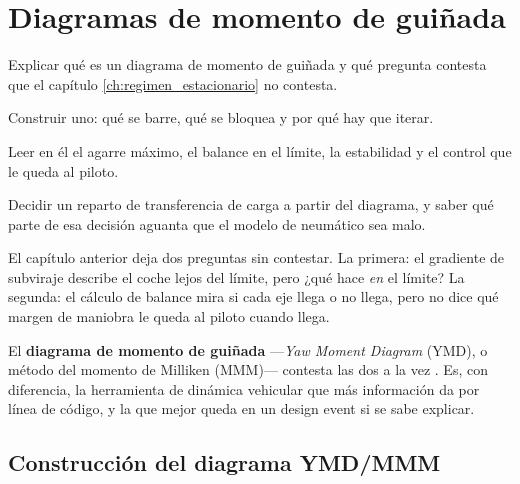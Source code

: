 \chapter{Diagramas de momento de guiñada}
\label{ch:diagramas_ymd}

\begin{objetivos}
  \item Explicar qué es un diagrama de momento de guiñada y qué pregunta
        contesta que el capítulo \ref{ch:regimen_estacionario} no contesta.
  \item Construir uno: qué se barre, qué se bloquea y por qué hay que iterar.
  \item Leer en él el agarre máximo, el balance en el límite, la estabilidad y
        el control que le queda al piloto.
  \item Decidir un reparto de transferencia de carga a partir del diagrama, y
        saber qué parte de esa decisión aguanta que el modelo de neumático sea
        malo.
\end{objetivos}


El capítulo anterior deja dos preguntas sin contestar. La primera: el gradiente
de subviraje describe el coche lejos del límite, pero ¿qué hace \emph{en} el
límite? La segunda: el cálculo de balance mira si cada eje llega o no llega,
pero no dice qué margen de maniobra le queda al piloto cuando llega.

El \textbf{diagrama de momento de guiñada} ---\emph{Yaw Moment Diagram} (YMD),
o método del momento de Milliken (MMM)--- contesta las dos a la vez
\cite{milliken_rcvd_1995}. Es, con diferencia, la herramienta de dinámica
vehicular que más información da por línea de código, y la que mejor queda en
un design event si se sabe explicar.

\section{Construcción del diagrama YMD/MMM}
\label{sec:diagramas_ymd:01}

